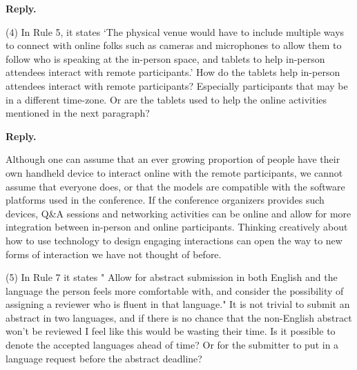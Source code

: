 \documentclass{article}
\newenvironment{Reply}{\noindent\color{BlueViolet}\textbf{Reply.}}{\vspace{1em}}
\begin{document}
\begin{Reply}
\end{Reply}

(4) In Rule 5, it states `The physical venue would have to include multiple ways to connect with online folks such as cameras and microphones to allow them to follow who is speaking at the in-person space, and tablets to help in-person attendees interact with remote participants.' How do the tablets help in-person attendees interact with remote participants? Especially participants that may be in a different time-zone. Or are the tablets used to help the online activities mentioned in the next paragraph?

\begin{Reply}

Although one can assume that an ever growing proportion of people have their own handheld device to interact online with the remote participants, we cannot assume that everyone does, or that the models are compatible with the software platforms used in the conference. 
If the conference organizers provides such devices, Q\&A sessions and networking activities can be online and allow for more integration between in-person and online participants. 
Thinking creatively about how to use technology to design engaging interactions can open the way to new forms of interaction we have not thought of before.  %
\end{Reply}

(5) In Rule 7 it states " Allow for abstract submission in both English and the language the person feels more comfortable with, and consider the possibility of assigning a reviewer who is fluent in that language." It is not trivial to submit an abstract in two languages, and if there is no chance that the non-English abstract won't be reviewed I feel like this would be wasting their time. Is it possible to denote the accepted languages ahead of time? Or for the submitter to put in a language request before the abstract deadline?
\end{document}
